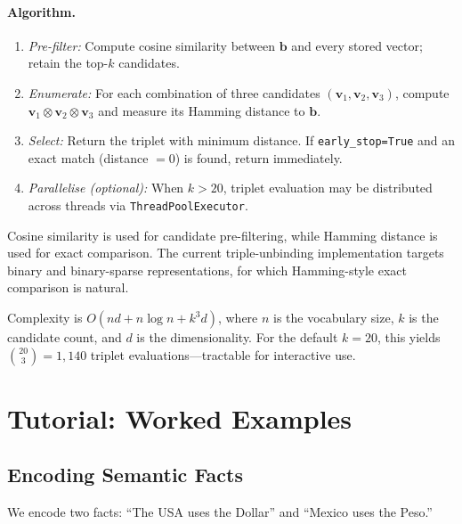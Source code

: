 \documentclass[11pt]{article}
\begin{document}
\paragraph{Algorithm.}
\begin{enumerate}
    \item \textit{Pre-filter:} Compute cosine similarity between $\mathbf{b}$ and every stored vector; retain the top-$k$ candidates.
    \item \textit{Enumerate:} For each combination of three candidates $(\mathbf{v}_1, \mathbf{v}_2, \mathbf{v}_3)$, compute $\mathbf{v}_1 \otimes \mathbf{v}_2 \otimes \mathbf{v}_3$ and measure its Hamming distance to $\mathbf{b}$.
    \item \textit{Select:} Return the triplet with minimum distance. If \texttt{early\_stop=True} and an exact match (distance $= 0$) is found, return immediately.
    \item \textit{Parallelise (optional):} When $k > 20$, triplet evaluation may be distributed across threads via \texttt{ThreadPoolExecutor}.
\end{enumerate}

\noindent Cosine similarity is used for candidate pre-filtering, while Hamming distance is used for exact comparison. The current triple-unbinding implementation targets binary and binary-sparse representations, for which Hamming-style exact comparison is natural.

\noindent Complexity is $O(nd + n \log n + k^3 d)$, where $n$ is the vocabulary size, $k$ is the candidate count, and $d$ is the dimensionality. For the default $k = 20$, this yields $\binom{20}{3} = 1{,}140$ triplet evaluations---tractable for interactive use.

\section{Tutorial: Worked Examples}

\subsection{Encoding Semantic Facts}

We encode two facts: ``The USA uses the Dollar'' and ``Mexico uses the Peso.''
\end{document}
